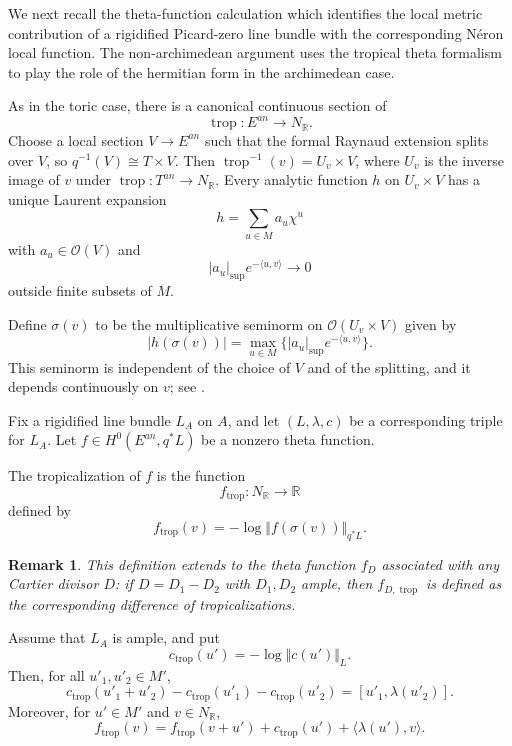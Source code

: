 \documentclass[10pt,a4paper]{amsart}
\theoremstyle{plain}
\newtheorem{remark}[theorem]{Remark}
\theoremstyle{plain}
\numberwithin{equation}{section}
\begin{document}
We next recall the theta-function calculation which identifies the local
metric contribution of a rigidified Picard-zero line bundle with the
corresponding N\'eron local function.  The non-archimedean argument uses the
tropical theta formalism to play the role of the hermitian form in the
archimedean case.

As in the toric case, there is a canonical continuous section of
\[
\operatorname{trop}:E^{an}\to N_{\mathbb R}.
\]
Choose a local section \(V\to E^{an}\) such that the formal Raynaud extension
splits over \(V\), so \(q^{-1}(V)\cong T\times V\).  Then
\(\operatorname{trop}^{-1}(v)=U_v\times V\), where \(U_v\) is the inverse image
of \(v\) under \(\operatorname{trop}:T^{an}\to N_{\mathbb R}\).  Every analytic
function \(h\) on \(U_v\times V\) has a unique Laurent expansion
\[
h=\sum_{u\in M}a_u\chi^u
\]
with \(a_u\in\mathscr O(V)\) and
\[
|a_u|_{\sup}e^{-\langle u,v\rangle}\to0
\]
outside finite subsets of \(M\).
\begin{defn}
	Define \(\sigma(v)\) to be the multiplicative seminorm on
	\(\mathscr O(U_v\times V)\) given by
	\[
	|h(\sigma(v))|
	=
	\max_{u\in M}\{|a_u|_{\sup}e^{-\langle u,v\rangle}\}.
	\]
	This seminorm is independent of the choice of \(V\) and of the splitting, and
	it depends continuously on \(v\); see \cite[Chapter~4.1]{TJFA}.
\end{defn}
Fix a rigidified line bundle \(L_A\) on \(A\), and let \((L,\lambda,c)\) be a
corresponding triple for \(L_A\).  Let
\(f\in H^0(E^{an},q^*L)\) be a nonzero theta function.
\begin{defn}
	The tropicalization of \(f\) is the function
	\[
	f_{\operatorname{trop}}:N_{\mathbb R}\to\mathbb R
	\]
	defined by
	\[
	f_{\operatorname{trop}}(v)
	=
	-\log\Vert f(\sigma(v))\Vert_{q^*L}.
	\]
\end{defn}
\begin{remark}
	This definition extends to the theta function \(f_D\) associated with any
	Cartier divisor \(D\): if \(D=D_1-D_2\) with \(D_1,D_2\) ample, then
	\(f_{D,\operatorname{trop}}\) is defined as the corresponding difference of
	tropicalizations.
\end{remark}
\begin{prop}
	Assume that \(L_A\) is ample, and put
	\[
	c_{\operatorname{trop}}(u')
	=
	-\log\Vert c(u')\Vert_L .
	\]
	Then, for all \(u'_1,u'_2\in M'\),
	\[
	c_{\operatorname{trop}}(u'_1+u'_2)
	-c_{\operatorname{trop}}(u'_1)
	-c_{\operatorname{trop}}(u'_2)
	=
	[u'_1,\lambda(u'_2)].
	\]
	Moreover, for \(u'\in M'\) and \(v\in N_{\mathbb R}\),
	\[
	f_{\operatorname{trop}}(v)
	=
	f_{\operatorname{trop}}(v+u')
	+c_{\operatorname{trop}}(u')
	+\langle\lambda(u'),v\rangle .
	\]
\end{prop}
\end{document}
